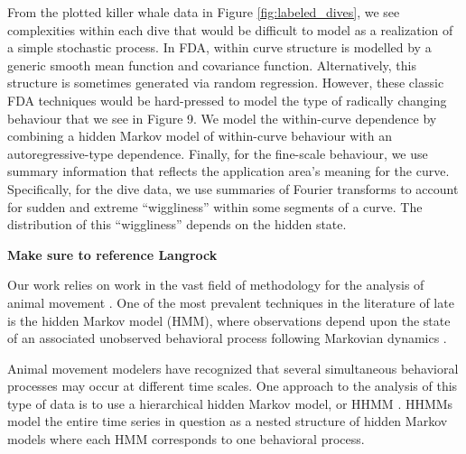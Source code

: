 From the plotted killer whale data in Figure {\ref{fig:labeled_dives}}, we see complexities within each dive that would be difficult to model as a realization of a simple stochastic process. 
In FDA, within curve structure is modelled by a generic smooth mean function and covariance function.
Alternatively, this structure is sometimes generated via random regression.
However, these classic FDA techniques would be hard-pressed to model the type of radically changing behaviour that we see in Figure 9.
We model the within-curve dependence by combining a hidden Markov model of within-curve behaviour with an autoregressive-type dependence. Finally, for the fine-scale behaviour, we use summary information that reflects the application area's meaning for the curve.  Specifically, for the dive data, we use summaries of Fourier transforms to account for sudden and extreme ``wiggliness'' within some segments of a curve. The distribution of this ``wiggliness'' depends on the hidden state.


{\bf{ Make sure to reference Langrock}}
 

Our work relies on work in the vast field of methodology for the analysis of animal movement
\citep{Hooten:2017}.
One of the most prevalent techniques in the literature of late is the hidden Markov model (HMM), where observations depend upon the state of an associated unobserved behavioral process following Markovian dynamics \citep{Patterson:2017}. 
%

Animal movement modelers have recognized that several simultaneous behavioral processes may occur at different time scales. 
One approach to the analysis of this type of data is to use a hierarchical hidden Markov model, or HHMM \citep{Barajas:2017,Adam:2019}. 
HHMMs model the entire time series in question as a nested structure of hidden Markov models where each HMM corresponds to one behavioral process.

